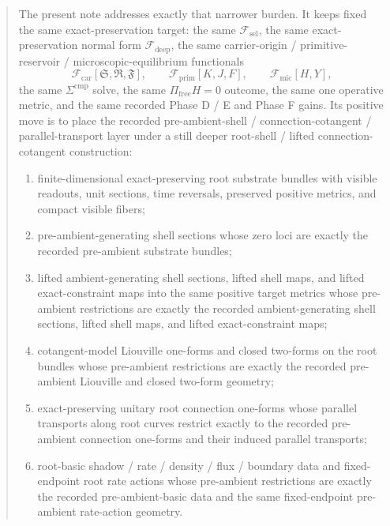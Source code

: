 \documentclass[11pt]{article}
\newcommand{\GaugeAux}{Y}
\newcommand{\MicFunctional}{\mathscr F_{\mathrm{mic}}}
\newcommand{\PrimFunctional}{\mathscr F_{\mathrm{prim}}}
\newcommand{\CarrierFunctional}{\mathscr F_{\mathrm{car}}}
\newcommand{\DeepFunctional}{\mathscr F_{\mathrm{deep}}}
\newcommand{\StemFunctional}{\mathscr F_{\mathrm{sel}}}
\newcommand{\PrimStrain}{K}
\newcommand{\PrimNeutral}{J}
\newcommand{\PrimFree}{F}
\newcommand{\CarrierSeed}{\mathfrak S}
\newcommand{\RelabelSeed}{\mathfrak R}
\newcommand{\FreeSeed}{\mathfrak F}
\begin{document}
\begin{abstract}
The present note addresses exactly that narrower burden. It keeps fixed the same exact-preservation target: the same \(\StemFunctional\), the same exact-preservation normal form \(\DeepFunctional\), the same carrier-origin / primitive-reservoir / microscopic-equilibrium functionals
\[
\CarrierFunctional[\CarrierSeed,\RelabelSeed,\FreeSeed],\qquad
\PrimFunctional[\PrimStrain,\PrimNeutral,\PrimFree],\qquad
\MicFunctional[H,\GaugeAux],
\]
the same \(\Sigma^{\mathrm{cmp}}\) solve, the same \(\Pi_{\mathrm{free}}H=0\) outcome, the same one operative metric, and the same recorded Phase D / E and Phase F gains. Its positive move is to place the recorded pre-ambient-shell / connection-cotangent / parallel-transport layer under a still deeper root-shell / lifted connection-cotangent construction:
\begin{enumerate}
    \item finite-dimensional exact-preserving root substrate bundles with visible readouts, unit sections, time reversals, preserved positive metrics, and compact visible fibers;
    \item pre-ambient-generating shell sections whose zero loci are exactly the recorded pre-ambient substrate bundles;
    \item lifted ambient-generating shell sections, lifted shell maps, and lifted exact-constraint maps into the same positive target metrics whose pre-ambient restrictions are exactly the recorded ambient-generating shell sections, lifted shell maps, and lifted exact-constraint maps;
    \item cotangent-model Liouville one-forms and closed two-forms on the root bundles whose pre-ambient restrictions are exactly the recorded pre-ambient Liouville and closed two-form geometry;
    \item exact-preserving unitary root connection one-forms whose parallel transports along root curves restrict exactly to the recorded pre-ambient connection one-forms and their induced parallel transports;
    \item root-basic shadow / rate / density / flux / boundary data and fixed-endpoint root rate actions whose pre-ambient restrictions are exactly the recorded pre-ambient-basic data and the same fixed-endpoint pre-ambient rate-action geometry.
\end{enumerate}


\end{abstract}
\end{document}
